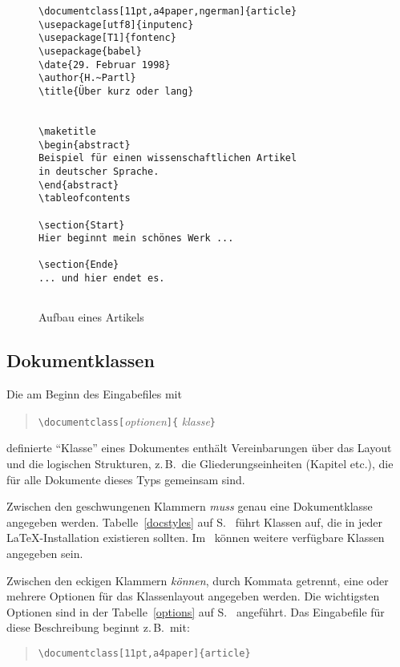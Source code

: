\begin{figure}[hbtp] %
\oben{10cm}
\begin{verbatim}
\documentclass[11pt,a4paper,ngerman]{article}
\usepackage[utf8]{inputenc}
\usepackage[T1]{fontenc}
\usepackage{babel}
\date{29. Februar 1998}
\author{H.~Partl}
\title{Über kurz oder lang}


\maketitle
\begin{abstract}
Beispiel für einen wissenschaftlichen Artikel
in deutscher Sprache.
\end{abstract}
\tableofcontents

\section{Start}
Hier beginnt mein schönes Werk ...

\section{Ende}
... und hier endet es.


\end{verbatim}
\unten
\caption{Aufbau eines Artikels} \label{dokument}
\end{figure}
 
 
\subsection{Dokumentklassen}\label{docsty}
 
Die am Beginn des Eingabefiles  mit
\begin{verse}
\verb|\documentclass[|\textit{optionen}\verb|]{|%
  \textit{klasse}\verb|}|
\end{verse}
definierte "`Klasse"' eines Dokumentes enthält 
Vereinbarungen über 
das Layout und die logischen Strukturen, z.\,B.\ die 
Gliederungseinheiten (Kapitel etc.\@), 
die für alle Dokumente dieses Typs gemeinsam sind.

Zwischen den geschwungenen Klammern \emph{muss} genau eine Dokumentklasse
angegeben werden.  Tabelle~\ref{docstyles} auf S.~\pageref{docstyles}
führt Klassen auf,
die in jeder \LaTeX-Installation existieren sollten.  
Im \local\ können weitere verfügbare 
Klassen angegeben sein.  
 
Zwischen den eckigen Klammern \emph{können}, durch Kommata getrennt, 
eine oder mehrere Optionen für das Klassenlayout
angegeben werden. Die wichtigsten Optionen sind in der 
Tabelle~\ref{options} auf S.~\pageref{options} angeführt.
Das Eingabefile für diese Beschreibung beginnt z.\,B.\ mit:
\begin{verse}
\verb|\documentclass[11pt,a4paper]{article}|
\end{verse}

